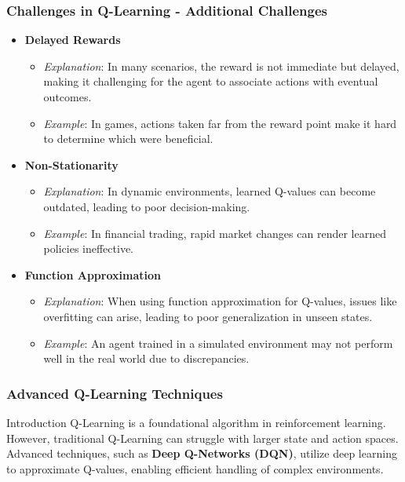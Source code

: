 \documentclass[aspectratio=169]{beamer}
\begin{document}
\begin{frame}[fragile]
    \frametitle{Challenges in Q-Learning - Additional Challenges}
    \begin{itemize}
        \item \textbf{Delayed Rewards}
            \begin{itemize}
                \item \textit{Explanation}: In many scenarios, the reward is not immediate but delayed, making it challenging for the agent to associate actions with eventual outcomes.
                \item \textit{Example}: In games, actions taken far from the reward point make it hard to determine which were beneficial.
            \end{itemize}

        \item \textbf{Non-Stationarity}
            \begin{itemize}
                \item \textit{Explanation}: In dynamic environments, learned Q-values can become outdated, leading to poor decision-making.
                \item \textit{Example}: In financial trading, rapid market changes can render learned policies ineffective.
            \end{itemize}

        \item \textbf{Function Approximation}
            \begin{itemize}
                \item \textit{Explanation}: When using function approximation for Q-values, issues like overfitting can arise, leading to poor generalization in unseen states.
                \item \textit{Example}: An agent trained in a simulated environment may not perform well in the real world due to discrepancies.
            \end{itemize}
    \end{itemize}
\end{frame}

\begin{frame}[fragile]
    \frametitle{Advanced Q-Learning Techniques}
    \begin{block}{Introduction}
        Q-Learning is a foundational algorithm in reinforcement learning. However, traditional Q-Learning can struggle with larger state and action spaces. Advanced techniques, such as \textbf{Deep Q-Networks (DQN)}, utilize deep learning to approximate Q-values, enabling efficient handling of complex environments.
    \end{block}
\end{frame}
\end{document}
